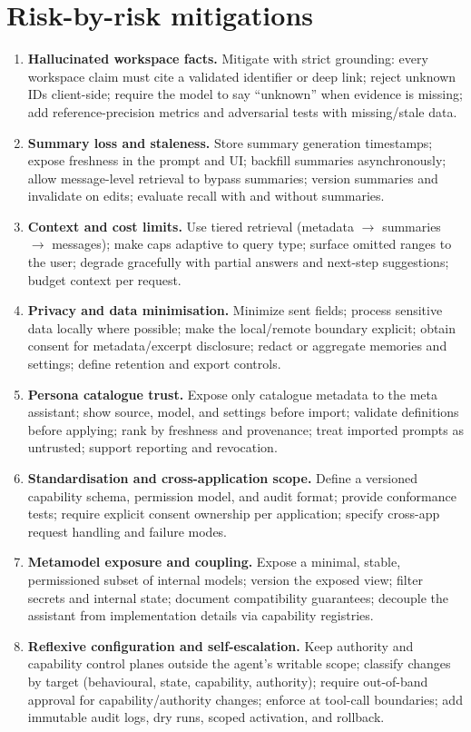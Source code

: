 \documentclass[11pt,a4paper]{article}
\begin{document}
\section{Risk-by-risk mitigations}
\begin{enumerate}[leftmargin=*]
\item \textbf{Hallucinated workspace facts.} Mitigate with strict grounding: every workspace claim must cite a validated identifier or deep link; reject unknown IDs client-side; require the model to say ``unknown'' when evidence is missing; add reference-precision metrics and adversarial tests with missing/stale data.
\item \textbf{Summary loss and staleness.} Store summary generation timestamps; expose freshness in the prompt and UI; backfill summaries asynchronously; allow message-level retrieval to bypass summaries; version summaries and invalidate on edits; evaluate recall with and without summaries.
\item \textbf{Context and cost limits.} Use tiered retrieval (metadata $\to$ summaries $\to$ messages); make caps adaptive to query type; surface omitted ranges to the user; degrade gracefully with partial answers and next-step suggestions; budget context per request.
\item \textbf{Privacy and data minimisation.} Minimize sent fields; process sensitive data locally where possible; make the local/remote boundary explicit; obtain consent for metadata/excerpt disclosure; redact or aggregate memories and settings; define retention and export controls.
\item \textbf{Persona catalogue trust.} Expose only catalogue metadata to the meta assistant; show source, model, and settings before import; validate definitions before applying; rank by freshness and provenance; treat imported prompts as untrusted; support reporting and revocation.
\item \textbf{Standardisation and cross-application scope.} Define a versioned capability schema, permission model, and audit format; provide conformance tests; require explicit consent ownership per application; specify cross-app request handling and failure modes.
\item \textbf{Metamodel exposure and coupling.} Expose a minimal, stable, permissioned subset of internal models; version the exposed view; filter secrets and internal state; document compatibility guarantees; decouple the assistant from implementation details via capability registries.
\item \textbf{Reflexive configuration and self-escalation.} Keep authority and capability control planes outside the agent's writable scope; classify changes by target (behavioural, state, capability, authority); require out-of-band approval for capability/authority changes; enforce at tool-call boundaries; add immutable audit logs, dry runs, scoped activation, and rollback.

\end{enumerate}
\end{document}
